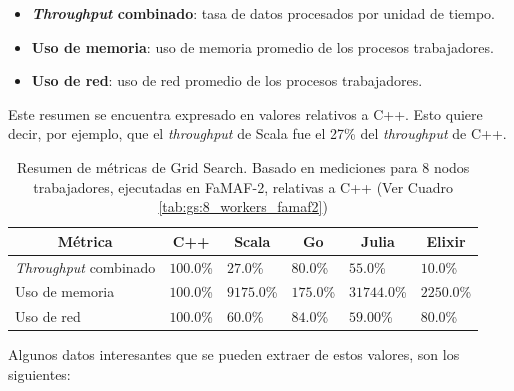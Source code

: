 \documentclass[11pt]{article}
\newcommand{\english}[1]{\textit{#1}}
\begin{document}
\begin{itemize}
    \item \textbf{\english{Throughput} combinado}: tasa de datos procesados por unidad de tiempo.
    \item \textbf{Uso de memoria}: uso de memoria promedio de los procesos trabajadores.
    \item \textbf{Uso de red}: uso de red promedio de los procesos trabajadores.
\end{itemize}

Este resumen se encuentra expresado en valores relativos a C++. Esto quiere decir, por ejemplo, que el \english{throughput} de Scala fue el 27\% del \english{throughput} de C++.

\begin{table}[h]
\centering
\begin{tabular}{|l|l|l|l|l|l|}
\hline
\multicolumn{1}{|c|}{Métrica} & \multicolumn{1}{c|}{C++} & \multicolumn{1}{c|}{Scala} & \multicolumn{1}{c|}{Go} & \multicolumn{1}{c|}{Julia} & \multicolumn{1}{c|}{Elixir} \\ \hline
\english{Throughput} combinado           & $100.0$\%                    & $27.0$\%                       & $80.0$\%                    & $55.0$\%                       & $10.0$\%                        \\ \hline
Uso de memoria                  & $100.0$\%                    & $9175.0$\%                     & $175.0$\%                   & $31744.0$\%                    & $2250.0$\%                      \\ \hline
Uso de red                 & $100.0$\%                    & $60.0$\%                       & $84.0$\%                    & $59.00$\%                       & $80.0$\%                        \\ \hline
\end{tabular}
\caption{Resumen de métricas de Grid Search. Basado en mediciones para 8 nodos trabajadores, ejecutadas en FaMAF-2, relativas a C++ (Ver Cuadro \ref{tab:gs:8_workers_famaf2})}
\label{tab:sis_dist:gs_metrics}
\end{table}

Algunos datos interesantes que se pueden extraer de estos valores, son los siguientes:
\end{document}
